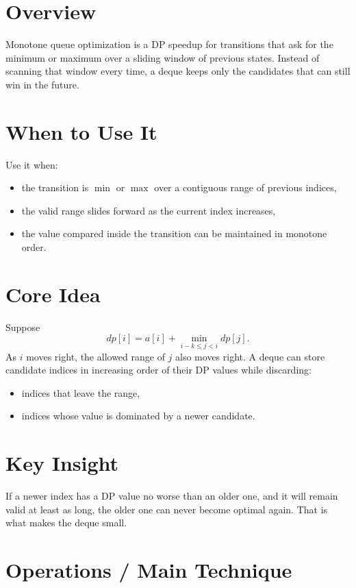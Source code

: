 \section*{Overview}

Monotone queue optimization is a DP speedup for transitions that ask for the minimum or maximum over a sliding window
of previous states. Instead of scanning that window every time, a deque keeps only the candidates that can still win in
the future.

\section*{When to Use It}

Use it when:

\begin{itemize}
  \item the transition is \(\min\) or \(\max\) over a contiguous range of previous indices,
  \item the valid range slides forward as the current index increases,
  \item the value compared inside the transition can be maintained in monotone order.
\end{itemize}

\section*{Core Idea}

Suppose
\[
dp[i] = a[i] + \min_{i-k \le j < i} dp[j].
\]
As \(i\) moves right, the allowed range of \(j\) also moves right. A deque can store candidate indices in increasing
order of their DP values while discarding:
\begin{itemize}
  \item indices that leave the range,
  \item indices whose value is dominated by a newer candidate.
\end{itemize}

\section*{Key Insight}

If a newer index has a DP value no worse than an older one, and it will remain valid at least as long, the older one
can never become optimal again. That is what makes the deque small.

\section*{Operations / Main Technique}

